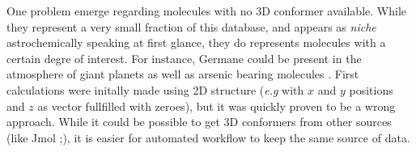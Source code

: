 \documentclass[article,preview]{planetary}
\begin{document}
\textcite{lias1988}

One problem emerge regarding molecules with no 3D conformer available. While they represent a very small fraction of this database, and appears as \textit{niche} astrochemically speaking at first glance, they do represents molecules with a certain degre of interest. For instance, Germane  could be present in the atmosphere of giant planets \parencites{coriceHypotheticalChemicalSpectroscopic1972,mosesAtmosphericChemistryUranus2020} as well as arsenic bearing molecules \parencites{bezardDetectionArsineSaturn1989,roedererDETECTIONELEMENTSALL2012}. First calculations were initally made using 2D structure (\textit{e.g} with $x$ and $y$ positions and $z$ as vector fullfilled with zeroes), but it was quickly proven to be a  wrong approach. While it could be possible to get 3D conformers from other sources (like Jmol ;\parencites{hansonJmolParadigmShift2010}), it is easier for automated workflow to keep the same source of data. 
\end{document}
